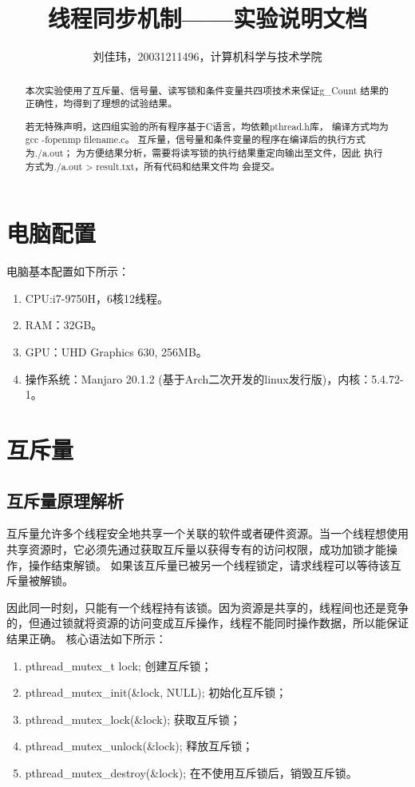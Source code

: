 \documentclass[11pt]{ctexart}
\title{线程同步机制——实验说明文档}
\author{刘佳玮，20031211496，计算机科学与技术学院}
\date{}
\begin{document}
\maketitle

\begin{abstract}
本次实验使用了互斥量、信号量、读写锁和条件变量共四项技术来保证{\ttfamily g\_Count}
结果的正确性，均得到了理想的试验结果。
    
若无特殊声明，这四组实验的所有程序基于C语言，均依赖{\ttfamily pthread.h}库，
编译方式均为{\ttfamily gcc -fopenmp filename.c}。
互斥量，信号量和条件变量的程序在编译后的执行方式为{\ttfamily ./a.out}；
为方便结果分析，需要将读写锁的执行结果重定向输出至文件，因此
执行方式为{\ttfamily ./a.out > result.txt}，所有代码和结果文件均
会提交。
\end{abstract}

\tableofcontents
\newpage

\section{电脑配置}

电脑基本配置如下所示：
\begin{enumerate}
    \item CPU:i7-9750H，6核12线程。
    \item RAM：32GB。
    \item GPU：UHD Graphics 630, 256MB。
    \item 操作系统：Manjaro 20.1.2 (基于Arch二次开发的linux发行版)，内核：5.4.72-1。
\end{enumerate}

\section{互斥量}

\subsection{互斥量原理解析}

互斥量允许多个线程安全地共享一个关联的软件或者硬件资源。当一个线程想使用共享资源时，它必须先通过获取互斥量以获得专有的访问权限，成功加锁才能操作，操作结束解锁。
如果该互斥量已被另一个线程锁定，请求线程可以等待该互斥量被解锁。

因此同一时刻，只能有一个线程持有该锁。因为资源是共享的，线程间也还是竞争的，但通过锁就将资源的访问变成互斥操作，线程不能同时操作数据，所以能保证结果正确。
核心语法如下所示：
\begin{enumerate}
    \item {\ttfamily pthread\_mutex\_t lock;} 创建互斥锁；
    \item {\ttfamily pthread\_mutex\_init(\&lock, NULL);} 初始化互斥锁；
    \item {\ttfamily pthread\_mutex\_lock(\&lock);} 获取互斥锁；
    \item {\ttfamily pthread\_mutex\_unlock(\&lock);} 释放互斥锁；
    \item {\ttfamily pthread\_mutex\_destroy(\&lock);} 在不使用互斥锁后，销毁互斥锁。
\end{enumerate}
\end{document}
